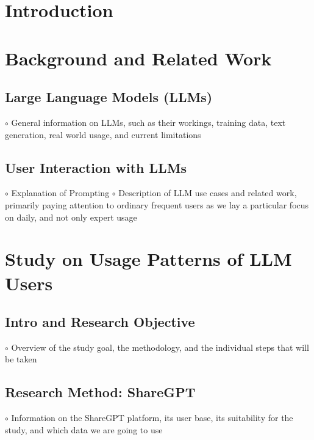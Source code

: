 \documentclass[sigconf]{acmart}
\begin{document}




\maketitle


\section{Introduction}

\section{Background and Related Work}
  \subsection{Large Language Models (LLMs)}
$\circ$ General information on LLMs, such as their workings, training data, text generation, real world usage, and current limitations
  \subsection{User Interaction with LLMs}
$\circ$ Explanation of Prompting \newline
$\circ$ Description of LLM use cases and related work, primarily paying attention to ordinary frequent users as we lay a particular focus on daily, and not only expert usage

\section{Study on Usage Patterns of LLM Users}
  \subsection{Intro and Research Objective}
$\circ$ Overview of the study goal, the methodology, and the individual steps that will be taken
  \subsection{Research Method: ShareGPT}
$\circ$ Information on the ShareGPT platform, its user base, its suitability for the study, and which data we are going to use
\end{document}
